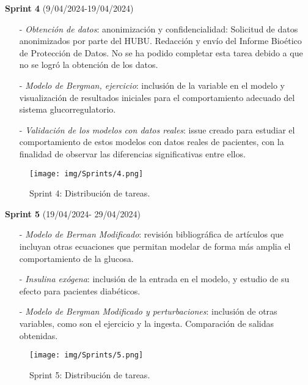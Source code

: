 \textbf{Sprint 4} (9/04/2024-19/04/2024)
\begin{enumerate}
    \item[-] \textit{Obtención de datos}: anonimización y confidencialidad: Solicitud de datos anonimizados por parte del HUBU. Redacción y envío del Informe Bioético de Protección de Datos. No se ha podido completar esta tarea debido a que no se logró la obtención de los datos. 
    \item[-] \textit{Modelo de Bergman, ejercicio}: inclusión de la variable en el modelo y visualización de resultados iniciales para el comportamiento adecuado del sistema glucorregulatorio.
    \item[-]  \textit{Validación de los modelos con datos reales}: issue creado para estudiar el comportamiento de estos modelos con datos reales de pacientes, con la finalidad de observar las diferencias significativas entre ellos.
\end{enumerate}
\clearpage
\begin{figure}[htbp]
    \centering
    \texttt{[image: img/Sprints/4.png]}
    \caption{Sprint 4: Distribución de tareas.}
    \label{fig:sprint4}
\end{figure}

\textbf{Sprint 5} (19/04/2024- 29/04/2024)
\begin{enumerate}
    \item[-] \textit{Modelo de Berman Modificado}: revisión bibliográfica de artículos que incluyan otras ecuaciones que permitan modelar de forma más amplia el comportamiento de la glucosa. 
    \item[-] \textit{Insulina exógena}: inclusión de la entrada en el modelo, y estudio de su efecto para pacientes diabéticos.
    \item[-]  \textit{Modelo de Bergman Modificado y perturbaciones}: inclusión de otras variables, como son el ejercicio y la ingesta. Comparación de salidas obtenidas.
\end{enumerate}
\clearpage
\begin{figure}[htbp]
    \centering
    \texttt{[image: img/Sprints/5.png]}
    \caption{Sprint 5: Distribución de tareas.}
    \label{fig:sprint5}
\end{figure}

